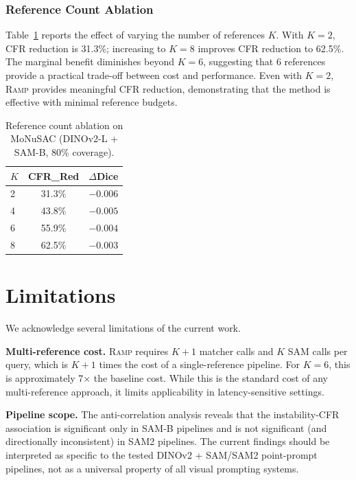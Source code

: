 \documentclass[11pt]{article}
\newcommand{\RAMP}{\textsc{Ramp}}
\begin{document}
\subsubsection{Reference Count Ablation}

Table~\ref{tab:refcount} reports the effect of varying the number of
references $K$. With $K=2$, CFR reduction is 31.3\%; increasing to $K=8$
improves CFR reduction to 62.5\%. The marginal benefit diminishes beyond
$K=6$, suggesting that 6 references provide a practical trade-off between
cost and performance. Even with $K=2$, \RAMP{} provides meaningful CFR
reduction, demonstrating that the method is effective with minimal reference
budgets.

\begin{table}[t]
\centering
\caption{Reference count ablation on MoNuSAC (DINOv2-L + SAM-B, 80\%
  coverage).}
\label{tab:refcount}
\begin{tabular}{lcc}
\toprule
$K$ & CFR\_Red & $\Delta$Dice \\
\midrule
2 & 31.3\% & $-0.006$ \\
4 & 43.8\% & $-0.005$ \\
6 & 55.9\% & $-0.004$ \\
8 & 62.5\% & $-0.003$ \\
\bottomrule
\end{tabular}
\end{table}

\section{Limitations}

We acknowledge several limitations of the current work.

\textbf{Multi-reference cost.} \RAMP{} requires $K+1$ matcher calls and $K$
SAM calls per query, which is $K+1$ times the cost of a single-reference
pipeline. For $K=6$, this is approximately 7$\times$ the baseline cost.
While this is the standard cost of any multi-reference approach, it limits
applicability in latency-sensitive settings.

\textbf{Pipeline scope.} The anti-correlation analysis reveals that the
instability-CFR association is significant only in SAM-B pipelines and is
not significant (and directionally inconsistent) in SAM2 pipelines. The
current findings should be interpreted as specific to the tested DINOv2 +
SAM/SAM2 point-prompt pipelines, not as a universal property of all visual
prompting systems.
\end{document}
